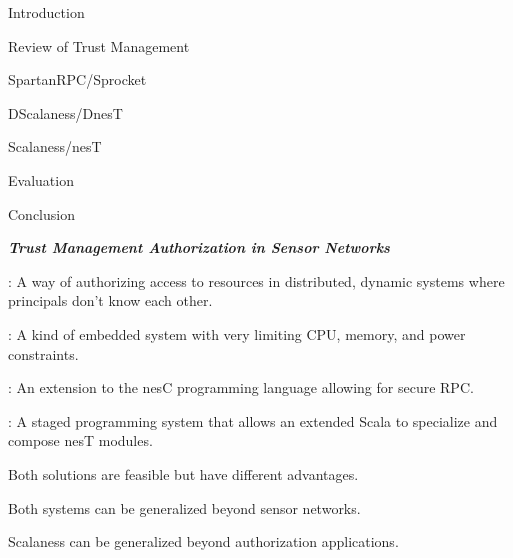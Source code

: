 
\newcommand{\cedge}[1]{\stackrel{#1}{\longleftarrow}}
\newcommand{\cred}[3]{\mathit{#1} \cedge{#3} \mathit{#2}}
\newcommand{\datalog}{\text{Datalog}}
\newcommand\T{\rule{0pt}{2.1ex}}

\begin{cenumerate}
\item Introduction
\item Review of Trust Management
\item SpartanRPC/Sprocket
\item DScalaness/DnesT
\item Scalaness/nesT
\item Evaluation
\item Conclusion
\end{cenumerate}
\stopslide


\centerline{\emph{\textbf{Trust Management Authorization in Sensor Networks}}}

\begin{citemize}
\item {}: A way of authorizing access to resources in distributed, dynamic
  systems where principals don't know each other.

\item {}: A kind of embedded system with very limiting CPU, memory, and
  power constraints.
\end{citemize}
\stopslide


\begin{citemize}
\item {}: An extension to the nesC programming language allowing for secure RPC.

\item {}: A staged programming system that allows an extended Scala to
  specialize and compose nesT modules.
\end{citemize}

Both solutions are feasible but have different advantages.

Both systems can be generalized beyond sensor networks.

Scalaness can be generalized beyond authorization applications.
\stopslide


